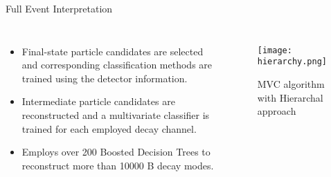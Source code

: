 \documentclass[12pt]{beamer}
\begin{document}
	\begin{frame}[t]{Full Event Interpretation}
		\fontsize{10pt}{10pt}\selectfont
		\begin{columns}
			\begin{itemize}
				\item Final-state particle candidates are selected and corresponding classification methods are trained using the detector information.
				\item Intermediate particle candidates are reconstructed and a multivariate classifier is trained for each employed decay channel.
				\item Employs over 200 Boosted Decision Trees to reconstruct more than 10000 B decay modes.
			\end{itemize}
			
			
			\begin{figure}
				\texttt{[image: hierarchy.png]}
				\caption{MVC algorithm with Hierarchal approach}
			\end{figure}
			
		\end{columns}
	\end{frame}
\end{document}
